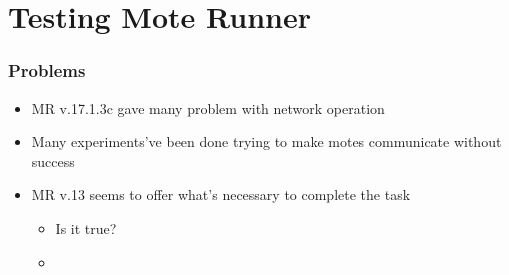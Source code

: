 \section{Testing Mote Runner}
\begin{frame}[fragile]
  \frametitle{Problems}
  \begin{itemize}
    \item MR v.17.1.3c gave many problem with network operation
    \item Many experiments've been done trying to make motes communicate without success
    \item MR v.13 seems to offer what's necessary to complete the task
    \begin{itemize}
    	\item Is it true?
    	\item 
    \end{itemize}
  \end{itemize}
\end{frame}